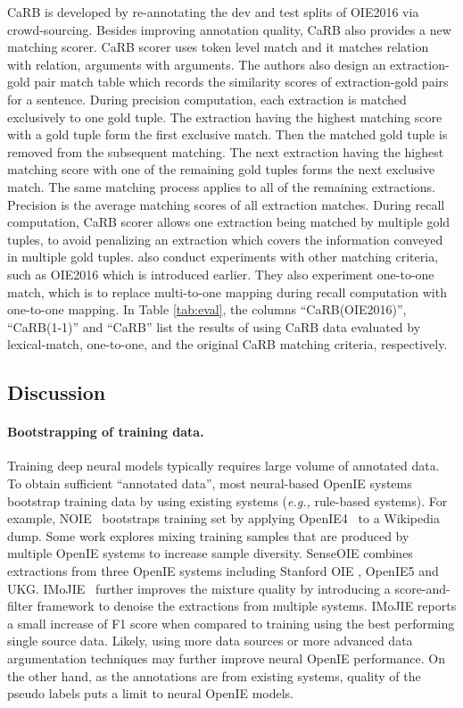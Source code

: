 \documentclass{article}
\newcommand{\eg}{\emph{e.g.,}\xspace}
\begin{document}
CaRB \cite{bhardwaj-etal-2019-carb} is developed by re-annotating the dev and test splits of OIE2016 via crowd-sourcing. Besides improving annotation quality, CaRB also provides a new matching scorer. CaRB scorer uses token level match and it matches relation with relation, arguments with arguments. The authors also design an extraction-gold pair match table which records the similarity scores of extraction-gold pairs for a sentence. During precision computation, each extraction is matched exclusively to one gold tuple. The extraction having the highest matching score with a gold tuple form the first exclusive match. Then the matched gold tuple is removed from the subsequent matching. The next extraction having the highest matching score with one of the remaining gold tuples forms the next exclusive match. The same matching process applies to all of the remaining extractions. Precision is the average matching scores of all extraction matches. During recall computation, CaRB scorer allows one extraction being matched by multiple gold tuples, to avoid penalizing an extraction which covers the information conveyed in multiple gold tuples. \cite{kolluru-etal-2020-openie6,yu2021maximal} also conduct experiments with other matching criteria, such as OIE2016 which is introduced earlier. They also experiment one-to-one match, which is to replace  multi-to-one mapping during recall computation with one-to-one mapping. In Table \ref{tab:eval}, the columns ``CaRB(OIE2016)'', ``CaRB(1-1)'' and ``CaRB'' list the results of using CaRB data evaluated by lexical-match, one-to-one, and the original CaRB matching criteria, respectively.

\subsection{Discussion}
\paragraph{Bootstrapping of training data.}
Training deep neural models typically requires large volume of annotated data. To obtain sufficient ``annotated data'', most neural-based OpenIE systems bootstrap training data by using existing systems (\eg rule-based systems). For example, NOIE~\cite{cui-etal-2018-neural} bootstraps  training set by applying OpenIE4~\cite{Mausam2016openie4} to a Wikipedia dump. Some work explores mixing  training samples that are produced by multiple OpenIE systems to increase sample diversity. SenseOIE \cite{roy-etal-2019-supervising} combines extractions from three OpenIE systems including Stanford OIE \cite{angeli-etal-2015-leveraging}, OpenIE5 \cite{saha-mausam-2018-open} and UKG. IMoJIE~\cite{kolluru-etal-2020-imojie} further improves the mixture quality by introducing a score-and-filter framework to denoise the extractions from multiple systems. IMoJIE reports a small increase of F1 score when compared to training using the best performing single source data. Likely, using more data sources or more advanced data argumentation techniques may further improve neural OpenIE performance. On the other hand, as the annotations are from existing systems, quality of the pseudo labels puts a limit to neural OpenIE models.
\end{document}
